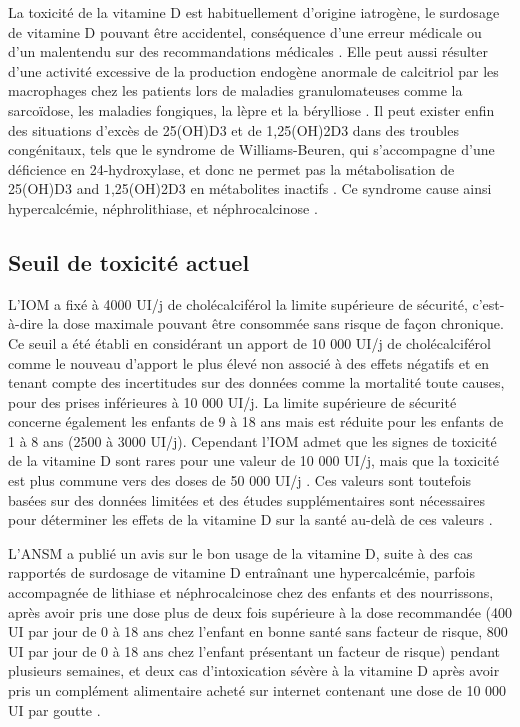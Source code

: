\documentclass[
  a4paper,
  DIV=11,
  numbers=noendperiod,
  listof=totoc]{scrreprt}
\begin{document}
La toxicité de la vitamine D est habituellement d'origine iatrogène, le
surdosage de vitamine D pouvant être accidentel, conséquence d'une
erreur médicale ou d'un malentendu sur des recommandations médicales
\autocite{Lim.2020vd}. Elle peut aussi résulter d'une activité excessive
de la production endogène anormale de calcitriol par les macrophages
chez les patients lors de maladies granulomateuses comme la sarcoïdose,
les maladies fongiques, la lèpre et la bérylliose
\autocite{Marcinowska-Suchowierska.2018}. Il peut exister enfin des
situations d'excès de \ac{25(OH)D3} et de \ac{1,25(OH)2D3} dans des
troubles congénitaux, tels que le syndrome de Williams-Beuren, qui
s'accompagne d'une déficience en 24-hydroxylase, et donc ne permet pas
la métabolisation de \ac{25(OH)D3} and \ac{1,25(OH)2D3} en métabolites
inactifs \autocite{Marcinowska-Suchowierska.2018}. Ce syndrome cause
ainsi hypercalcémie, néphrolithiase, et néphrocalcinose
\autocite{Azer.2021}.

\subsection{Seuil de toxicité actuel}\label{seuil-de-toxicituxe9-actuel}

L'\ac{IOM} a fixé à 4000 UI/j de cholécalciférol la limite supérieure de
sécurité, c'est-à-dire la dose maximale pouvant être consommée sans
risque de façon chronique. Ce seuil a été établi en considérant un
apport de 10 000 UI/j de cholécalciférol comme le nouveau d'apport le
plus élevé non associé à des effets négatifs et en tenant compte des
incertitudes sur des données comme la mortalité toute causes, pour des
prises inférieures à 10 000 UI/j. La limite supérieure de sécurité
concerne également les enfants de 9 à 18 ans mais est réduite pour les
enfants de 1 à 8 ans (2500 à 3000 UI/j). Cependant l'IOM admet que les
signes de toxicité de la vitamine D sont rares pour une valeur de 10 000
UI/j, mais que la toxicité est plus commune vers des doses de 50 000
UI/j . Ces valeurs sont toutefois basées sur des données limitées et des
études supplémentaires sont nécessaires pour déterminer les effets de la
vitamine D sur la santé au-delà de ces valeurs \autocite{IOM.2011}.

L'ANSM a publié un avis sur le bon usage de la vitamine D, suite à des
cas rapportés de surdosage de vitamine D entraînant une hypercalcémie,
parfois accompagnée de lithiase et néphrocalcinose chez des enfants et
des nourrissons, après avoir pris une dose plus de deux fois supérieure
à la dose recommandée (400 UI par jour de 0 à 18 ans chez l'enfant en
bonne santé sans facteur de risque, 800 UI par jour de 0 à 18 ans chez
l'enfant présentant un facteur de risque) pendant plusieurs semaines, et
deux cas d'intoxication sévère à la vitamine D après avoir pris un
complément alimentaire acheté sur internet contenant une dose de 10 000
UI par goutte \autocite{ANSM.2021}.
\end{document}
